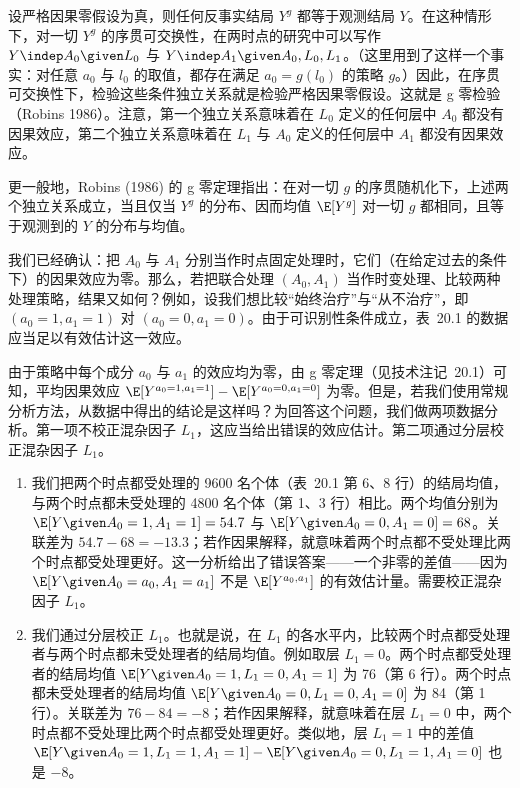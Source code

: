 \begin{techpoint}[g 零检验]
设严格因果零假设为真，则任何反事实结局 $Y^{g}$ 都等于观测结局 $Y$。在这种情形下，对一切 $Y^{g}$ 的序贯可交换性，在两时点的研究中可以写作 $Y\indep A_0\given L_0$ 与 $Y\indep A_1\given A_0,L_0,L_1$。（这里用到了这样一个事实：对任意 $a_0$ 与 $l_0$ 的取值，都存在满足 $a_0=g(l_0)$ 的策略 $g$。）因此，在序贯可交换性下，检验这些条件独立关系就是检验严格因果零假设。这就是 g 零检验（Robins 1986）。注意，第一个独立关系意味着在 $L_0$ 定义的任何层中 $A_0$ 都没有因果效应，第二个独立关系意味着在 $L_1$ 与 $A_0$ 定义的任何层中 $A_1$ 都没有因果效应。

更一般地，Robins (1986) 的 g 零定理指出：在对一切 $g$ 的序贯随机化下，上述两个独立关系成立，当且仅当 $Y^{g}$ 的分布、因而均值 $\E[Y^{g}]$ 对一切 $g$ 都相同，且等于观测到的 $Y$ 的分布与均值。
\end{techpoint}

我们已经确认：把 $A_0$ 与 $A_1$ 分别当作时点固定处理时，它们（在给定过去的条件下）的因果效应为零。那么，若把联合处理 $(A_0,A_1)$ 当作时变处理、比较两种处理策略，结果又如何？例如，设我们想比较“始终治疗”与“从不治疗”，即 $(a_0=1,a_1=1)$ 对 $(a_0=0,a_1=0)$。由于可识别性条件成立，表~20.1 的数据应当足以有效估计这一效应。

由于策略中每个成分 $a_0$ 与 $a_1$ 的效应均为零，由 g 零定理（见技术注记~20.1）可知，平均因果效应 $\E[Y^{a_0=1,a_1=1}]-\E[Y^{a_0=0,a_1=0}]$ 为零。但是，若我们使用常规分析方法，从数据中得出的结论是这样吗？为回答这个问题，我们做两项数据分析。第一项不校正混杂因子 $L_1$，这应当给出错误的效应估计。第二项通过分层校正混杂因子 $L_1$。

\begin{enumerate}
\item 我们把两个时点都受处理的 9600 名个体（表~20.1 第 6、8 行）的结局均值，与两个时点都未受处理的 4800 名个体（第 1、3 行）相比。两个均值分别为 $\E[Y\given A_0=1,A_1=1]=54.7$ 与 $\E[Y\given A_0=0,A_1=0]=68$。关联差为 $54.7-68=-13.3$；若作因果解释，就意味着两个时点都不受处理比两个时点都受处理更好。这一分析给出了错误答案——一个非零的差值——因为 $\E[Y\given A_0=a_0,A_1=a_1]$ 不是 $\E[Y^{a_0,a_1}]$ 的有效估计量。需要校正混杂因子 $L_1$。

\item 我们通过分层校正 $L_1$。也就是说，在 $L_1$ 的各水平内，比较两个时点都受处理者与两个时点都未受处理者的结局均值。例如取层 $L_1=0$。两个时点都受处理者的结局均值 $\E[Y\given A_0=1,L_1=0,A_1=1]$ 为 76（第 6 行）。两个时点都未受处理者的结局均值 $\E[Y\given A_0=0,L_1=0,A_1=0]$ 为 84（第 1 行）。关联差为 $76-84=-8$；若作因果解释，就意味着在层 $L_1=0$ 中，两个时点都不受处理比两个时点都受处理更好。类似地，层 $L_1=1$ 中的差值 $\E[Y\given A_0=1,L_1=1,A_1=1]-\E[Y\given A_0=0,L_1=1,A_1=0]$ 也是 $-8$。
\end{enumerate}

